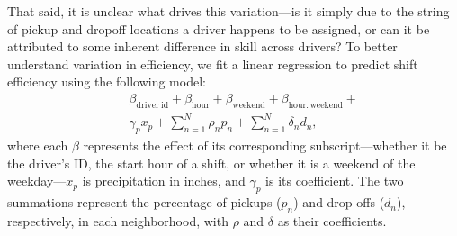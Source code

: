 \documentclass[twocolumn]{article}
\begin{document}
That said, it is unclear what drives this variation---is it simply due to the string of pickup and dropoff locations a driver happens to be assigned, or can it be attributed to some inherent difference in skill across drivers?
To better understand variation in efficiency, we fit a linear regression to predict shift efficiency using the following model:
\begin{eqnarray*}
&& \beta_{\mathrm{driver~id}} + \beta_{\mathrm{hour}} + \beta_{\mathrm{weekend}} + \beta_{\mathrm{hour:weekend}} + \\
  & & \gamma_p x_p + \sum_{n=1}^N \rho_n p_n + \sum_{n=1}^N \delta_n d_n,
\end{eqnarray*}
where each $\beta$ represents the effect of its corresponding subscript---whether it be the driver's ID, the start hour of a shift, or whether it is a weekend of the weekday---$x_p$ is precipitation in inches, and $\gamma_p$ is its coefficient. The two summations represent the percentage of pickups ($p_n$) and drop-offs ($d_n$), respectively, in each neighborhood, with $\rho$ and $\delta$ as their coefficients.
\end{document}
